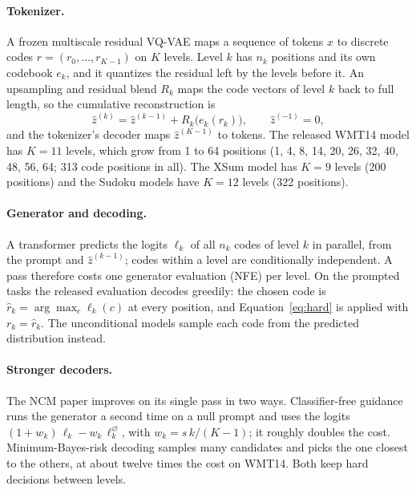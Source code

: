 \documentclass[11pt]{article}
\begin{document}
\paragraph{Tokenizer.} A frozen multiscale residual VQ-VAE \citep{oord2017vqvae,lee2022rqvae,tian2024var} maps a
sequence of tokens $x$ to discrete codes $r=(r_0,\dots,r_{K-1})$ on $K$ levels. Level $k$ has $n_k$ positions and its
own codebook $e_k$, and it quantizes the residual left by the levels before it. An upsampling and residual blend $R_k$ maps the code vectors of
level $k$ back to full length, so the cumulative reconstruction is
\begin{equation}
\hat z^{(k)}=\hat z^{(k-1)}+R_k\big(e_k(r_k)\big),\qquad \hat z^{(-1)}=0,
\label{eq:hard}
\end{equation}
and the tokenizer's decoder maps $\hat z^{(K-1)}$ to tokens. The released WMT14 model has $K=11$ levels, which grow
from 1 to 64 positions (1, 4, 8, 14, 20, 26, 32, 40, 48, 56, 64; 313 code positions in all). The XSum model has $K=9$
levels (200 positions) and the Sudoku models have $K=12$ levels (322 positions).

\paragraph{Generator and decoding.} A transformer predicts the logits $\ell_k$ of all $n_k$ codes of level $k$ in
parallel, from the prompt and $\hat z^{(k-1)}$; codes within a level are conditionally independent. A pass therefore
costs one generator evaluation (NFE) per level. On the prompted tasks the released evaluation decodes greedily: the
chosen code is $\hat r_k=\arg\max_c \ell_k(c)$ at every position, and Equation~\ref{eq:hard} is applied with
$r_k=\hat r_k$. The unconditional models sample each code from the predicted distribution instead.

\paragraph{Stronger decoders.} The NCM paper improves on its single pass in two ways.
Classifier-free guidance \citep{ho2022cfg} runs the generator a second time on a null prompt and uses the logits
$(1+w_k)\,\ell_k-w_k\,\ell_k^{\varnothing}$, with $w_k=s\,k/(K-1)$; it roughly doubles the cost. Minimum-Bayes-risk
decoding \citep{kumar2004mbr} samples many candidates and picks the one closest to the others, at about twelve times
the cost on WMT14. Both keep hard decisions between levels.
\end{document}

